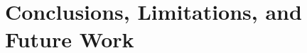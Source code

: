 \documentclass[crop=false]{stdlocal}
\begin{document}
\section{Conclusions, Limitations, and Future Work} %
\label{sec:conclusions}

\end{document}
